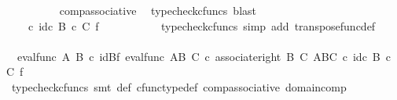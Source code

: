 \begin{isabellebody}
\ \ \ \ \ \ \ \ \isamarkupfalse%
\ comp{\isacharunderscore}{\kern0pt}associative{}\ \isamarkupfalse%
\ {\isacharparenleft}{\kern0pt}typecheck{\isacharunderscore}{\kern0pt}cfuncs{\isacharcomma}{\kern0pt}\ blast{\isacharparenright}{\kern0pt}\isanewline
\ \ \ \ \ \ \isamarkupfalse%
\ \isamarkupfalse%
\ {\isachardoublequoteopen}{\isachardot}{\kern0pt}{\isachardot}{\kern0pt}{\isachardot}{\kern0pt}\ {\isacharequal}{\kern0pt}\ {\isasympsi}\ {\isasymcirc}\isactrlsub c\ {\isacharparenleft}{\kern0pt}id\isactrlsub c\ {\isacharparenleft}{\kern0pt}B\ {\isasymtimes}\isactrlsub c\ C{\isacharparenright}{\kern0pt}\ {\isasymtimes}\isactrlsub f\ {\isasymphi}\isactrlsup {\isasymsharp}\isactrlsup {\isasymsharp}{\isacharparenright}{\kern0pt}{\isachardoublequoteclose}\isanewline
\ \ \ \ \ \ \ \ \isamarkupfalse%
\ {\isacharparenleft}{\kern0pt}typecheck{\isacharunderscore}{\kern0pt}cfuncs{\isacharcomma}{\kern0pt}\ simp\ add{\isacharcolon}{\kern0pt}\ transpose{\isacharunderscore}{\kern0pt}func{\isacharunderscore}{\kern0pt}def{\isacharparenright}{\kern0pt}\isanewline
\ \ \ \ \ \ \isamarkupfalse%
\ \isamarkupfalse%
\ {\isachardoublequoteopen}{\isachardot}{\kern0pt}{\isachardot}{\kern0pt}{\isachardot}{\kern0pt}\ {\isacharequal}{\kern0pt}{\isacharparenleft}{\kern0pt}eval{\isacharunderscore}{\kern0pt}func\ A\ B{\isacharparenright}{\kern0pt}\ {\isasymcirc}\isactrlsub c\ {\isacharparenleft}{\kern0pt}id{\isacharparenleft}{\kern0pt}B{\isacharparenright}{\kern0pt}{\isasymtimes}\isactrlsub f\ eval{\isacharunderscore}{\kern0pt}func\ {\isacharparenleft}{\kern0pt}A\isactrlbsup B\isactrlesup {\isacharparenright}{\kern0pt}\ C{\isacharparenright}{\kern0pt}\ {\isasymcirc}\isactrlsub c\ {\isacharparenleft}{\kern0pt}associate{\isacharunderscore}{\kern0pt}right\ B\ C\ {\isacharparenleft}{\kern0pt}{\isacharparenleft}{\kern0pt}A\isactrlbsup B\isactrlesup {\isacharparenright}{\kern0pt}\isactrlbsup C\isactrlesup {\isacharparenright}{\kern0pt}{\isacharparenright}{\kern0pt}\ {\isasymcirc}\isactrlsub c\ {\isacharparenleft}{\kern0pt}id\isactrlsub c\ {\isacharparenleft}{\kern0pt}B\ {\isasymtimes}\isactrlsub c\ C{\isacharparenright}{\kern0pt}\ {\isasymtimes}\isactrlsub f\ {\isasymphi}\isactrlsup {\isasymsharp}\isactrlsup {\isasymsharp}{\isacharparenright}{\kern0pt}{\isachardoublequoteclose}\isanewline
\ \ \ \ \ \ \ \ \isamarkupfalse%
\ {\isacharparenleft}{\kern0pt}typecheck{\isacharunderscore}{\kern0pt}cfuncs{\isacharcomma}{\kern0pt}\ smt\ {\isasympsi}{\isacharunderscore}{\kern0pt}def\ cfunc{\isacharunderscore}{\kern0pt}type{\isacharunderscore}{\kern0pt}def\ comp{\isacharunderscore}{\kern0pt}associative\ domain{\isacharunderscore}{\kern0pt}comp{\isacharparenright}{\kern0pt}\isanewline

\end{isabellebody}
